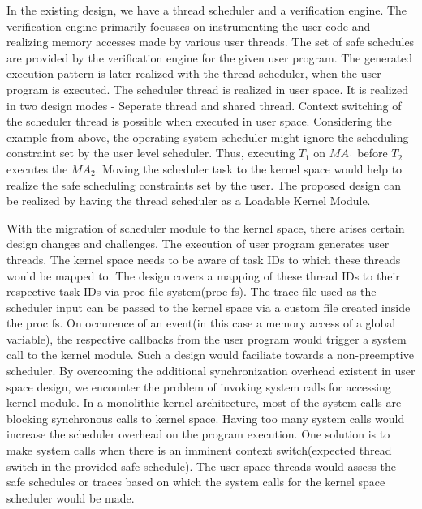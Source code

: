 \documentclass[12pt]{article}
\begin{document}
In the existing design, we have a thread scheduler and a verification engine.  
The verification engine primarily focusses on instrumenting the user code and realizing memory accesses made by various user threads. 
The set of safe schedules are provided by the verification engine for the given user program. 
The generated execution pattern is later realized with the thread scheduler, when the user program is executed. 
The scheduler thread is realized in user space. 
It is realized in two design modes - Seperate thread and shared thread. 
Context switching of the scheduler thread is possible when executed in user space. 
Considering the example from above, the operating system scheduler might ignore the scheduling constraint set by the user level scheduler. 
Thus, executing $T_{1}$ on $MA_{1}$ before $T_{2}$ executes the $MA_{2}$. 
Moving the scheduler task to the kernel space would help to realize the safe scheduling constraints set by the user. 
The proposed design can be realized by having the thread scheduler as a Loadable Kernel Module. 

With the migration of scheduler module to the kernel space, there arises certain design changes and challenges. 
The execution of user program generates user threads. 
The kernel space needs to be aware of task IDs to which these threads would be mapped to. 
The design covers a mapping of these thread IDs to their respective task IDs via proc file system(proc fs). 
The trace file used as the scheduler input can be passed to the kernel space via a custom file created inside the proc fs. 
On occurence of an event(in this case a memory access of a global variable), the respective callbacks from the user program would trigger a system call to the kernel module. 
Such a design would faciliate towards a non-preemptive scheduler. 
By overcoming the additional synchronization overhead existent in user space design, we encounter the problem of invoking system calls for accessing kernel module. 
In a monolithic kernel architecture, most of the system calls are blocking synchronous calls to kernel space. 
Having too many system calls would increase the scheduler overhead on the program execution. 
One solution is to make system calls when there is an imminent context switch(expected thread switch in the provided safe schedule). 
The user space threads would assess the safe schedules or traces based on which the system calls for the kernel space scheduler would be made. 
\end{document}
